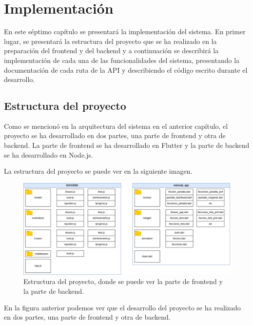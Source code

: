 \chapter{Implementación}
En este séptimo capítulo se presentará la implementación del sistema. En primer lugar, se presentará la estructura del proyecto que se ha realizado en la preparación del frontend y del backend y a continuación
se describirá la implementación de cada una de las funcionalidades del sistema, presentando la documentación de cada ruta de la API y describiendo el código escrito durante el desarrollo.

\section{Estructura del proyecto}
\label{sec:estructura}
Como se mencionó en la arquitectura del sistema en el anterior capítulo, el proyecto se ha desarrollado en dos partes, una parte de frontend y otra de backend. La parte de frontend se ha desarrollado en Flutter y la parte de backend se ha desarrollado en Node.js. 

La estructura del proyecto se puede ver en la siguiente imagen.
\begin{figure}[H]
  \centering
  \includegraphics[width=\textwidth]{imagenes/c7/estructura.png}
  \caption{Estructura del proyecto, donde se puede ver la parte de frontend y la parte de backend.}
  \label{fig:login}
\end{figure}

En la figura anterior podemos ver que el desarrollo del proyecto se ha realizado en dos partes, una parte de frontend y otra de backend.

